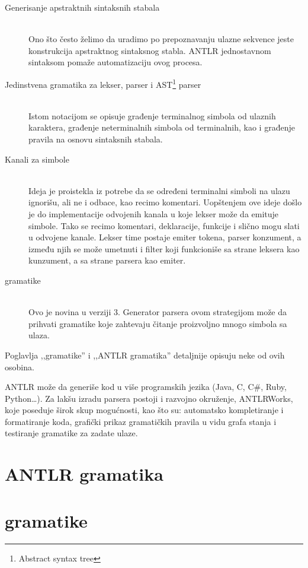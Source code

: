 \begin{description}
	\item[Generisanje apstraktnih sintaksnih stabala] \hfill \\
	Ono što često želimo da uradimo po prepoznavanju ulazne sekvence jeste konstrukcija apstraktnog sintaksnog stabla. ANTLR jednostavnom sintaksom pomaže automatizaciju ovog procesa.
	\item[Jedinstvena gramatika za lekser, parser i AST\footnote{\skr \eng Abstract syntax tree}  parser] \hfill \\
	Istom notacijom se opisuje građenje terminalnog simbola od ulaznih karaktera, građenje neterminalnih simbola od terminalnih, kao i građenje pravila na osnovu sintaksnih stabala.
	\item[Kanali za simbole] \hfill \\
	Ideja je proistekla iz potrebe da se određeni terminalni simboli na ulazu ignorišu, ali ne i odbace, kao recimo komentari. 
Uopštenjem ove ideje došlo je do implementacije odvojenih kanala u koje lekser može da emituje simbole. Tako se recimo komentari, deklaracije, funkcije i slično mogu slati u odvojene kanale. 
Lekser time postaje emiter tokena, parser konzument, a između njih se može umetnuti i filter koji funkcioniše sa strane leksera kao kunzument, a sa strane parsera kao emiter.
	\item [\LLa gramatike] \hfill \\
	Ovo je novina u verziji 3. Generator parsera ovom strategijom može da prihvati gramatike koje zahtevaju čitanje proizvoljno mnogo simbola sa ulaza.

\end{description}

Poglavlja ,,\LLa gramatike'' i ,,ANTLR gramatika'' detaljnije opisuju neke od ovih osobina.
  
ANTLR može da generiše kod u više programskih jezika (Java, C, C\#, Ruby, Python\ldots). 
Za lakšu izradu parsera postoji i razvojno okruženje, ANTLRWorks, koje poseduje širok skup mogućnosti, kao što su: 
automatsko kompletiranje i formatiranje koda, grafički prikaz gramatičkih pravila u vidu grafa stanja i testiranje gramatike za zadate ulaze.


\section{ANTLR gramatika}


\section{\LLa gramatike}






